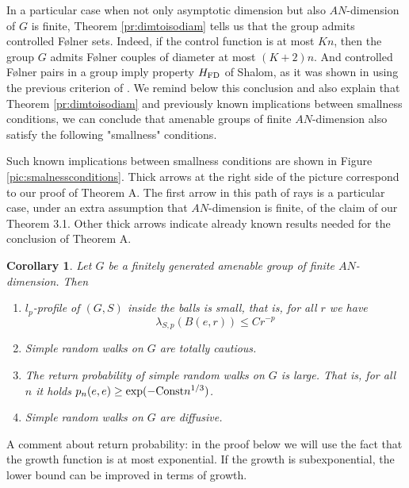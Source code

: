\documentclass{amsart}
\numberwithin{figure}{section}
\theoremstyle{plain}
\newtheorem{corol}[thm]{Corollary}
\theoremstyle{definition}
\begin{document}
In a particular case when  not only asymptotic dimension but also $AN$-dimension of $G$ is finite, Theorem \ref{pr:dimtoisodiam} tells us that
the group admits controlled F{\o}lner sets. Indeed, if the control function is at most $Kn$, then the group $G$ admits F{\o}lner couples of diameter at most $(K+2)n$. And controlled F{\o}lner pairs in a group imply property $H_{\rm FD}$ of Shalom, as it was shown
in \cite{erschlerzheng} using the previous criterion of \cite{erschlerozawa}.
We remind below this conclusion and also explain  that Theorem \ref{pr:dimtoisodiam} and previously known implications between smallness conditions,  we can conclude that amenable groups of finite $AN$-dimension
also satisfy the following "smallness" conditions.

Such known implications between smallness conditions are shown in Figure \ref{pic:smalnessconditions}. Thick arrows at the right side of the picture correspond to our proof of Theorem A. The first arrow in this path of rays is a particular case,
under an extra assumption that $AN$-dimension is finite, of the claim of our Theorem  3.1. 
Other thick arrows indicate already known results needed for the conclusion of Theorem A.


\begin{corol}
Let $G$ be a finitely generated amenable group of finite $AN$-dimension.
Then
\begin{enumerate}

\item $l_p$-profile of $(G,S)$ inside the balls is small, that is,  for all $r$ we have
$$
\lambda_{S,p}(B(e, r)) \le Cr^{-p}
$$
\item Simple random walks on $G$ are totally cautious.

\item The return probability of simple random walks on $G$ is large. That is, for all $n$
it holds
$p_n(e,e) \ge \exp(- {\rm Const}n^{1/3})$.


\item Simple random walks on $G$ are diffusive.
\end{enumerate}

\end{corol}

A comment about return probability: in the proof below we will use the fact that the growth function is at most exponential. If the growth is subexponential,  the lower bound can be improved in terms of growth.
\end{document}
